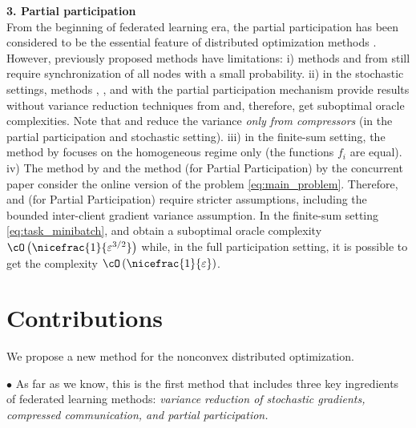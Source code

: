 \documentclass{article}
\newcommand{\algorithmname}{DASHA-PP}
\begin{document}
\textbf{3. Partial participation} \\
From the beginning of federated learning era, the partial participation has been considered to be the essential feature of distributed optimization methods \citep{mcmahan2017communication, konevcny2016federated, kairouz2021advances}. 
However, previously proposed methods have limitations: i) methods  and  from \citep{MARINA, zhao2021fedpage} still require synchronization of all nodes with a small probability. ii) in the stochastic settings, methods , , and  with the partial participation mechanism \citep{mcmahan2017communication, karimireddy2020scaffold, zhao2021faster} provide results without variance reduction techniques from \citep{SPIDER, PAGE, cutkosky2019momentum} and, therefore, get suboptimal oracle complexities. Note that  and  reduce the variance \textit{only from compressors} (in the partial participation and stochastic setting). iii) in the finite-sum setting, the  method by \cite{li2021zerosarah} focuses on the homogeneous regime only (the functions $f_i$ are equal). iv) The  method by \cite{karimireddy2020mime} and the  method (for Partial Participation) by the concurrent paper \citep{pateltowards} consider the online version of the problem \eqref{eq:main_problem}. Therefore,  and  (for Partial Participation) require stricter assumptions, including the bounded inter-client gradient variance assumption. In the finite-sum setting \eqref{eq:task_minibatch},  and  obtain a suboptimal oracle complexity $\cO\left(\nicefrac{1}{\varepsilon^{3/2}}\right)$ while, in the full participation setting, it is possible to get the complexity $\cO\left(\nicefrac{1}{\varepsilon}\right)$.

\section{Contributions}
We propose a new method \algname{\algorithmname} for the nonconvex distributed optimization.

$\bullet$ As far as we know, this is the first method that includes three key ingredients of federated learning methods: \textit{variance reduction of stochastic gradients, compressed communication, and partial participation.} 
\end{document}
